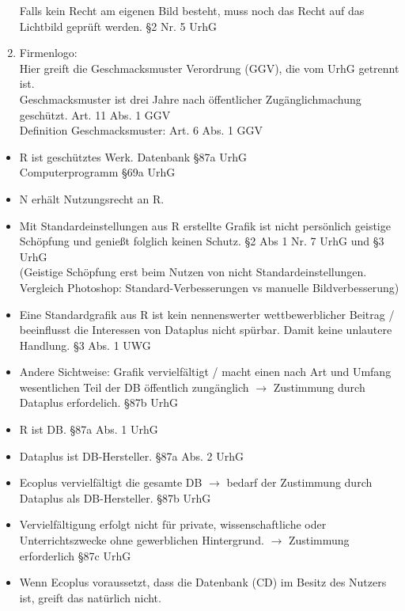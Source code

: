 \documentclass{scrreprt}
\begin{document}
\begin{anumerate}
\begin{enumerate}[label=\roman*.]
Falls kein Recht am eigenen Bild besteht, muss noch das Recht auf das Lichtbild geprüft werden. \hfill §2 Nr. 5 UrhG
\item Firmenlogo:\\
Hier greift die Geschmacksmuster Verordrung (GGV), die vom UrhG getrennt ist.\\
Geschmacksmuster ist drei Jahre nach öffentlicher Zugänglichmachung geschützt. \hfill Art. 11 Abs. 1 GGV\\
Definition Geschmacksmuster: Art. 6 Abs. 1 GGV
\end{enumerate}
\item \begin{itemize}
\item R ist geschütztes Werk. \hfill Datenbank §87a UrhG\\
\phantom{R}\hfill Computerprogramm §69a UrhG
\item N erhält Nutzungsrecht an R.
\item Mit Standardeinstellungen aus R erstellte Grafik ist nicht persönlich geistige Schöpfung und genießt folglich keinen Schutz. \hfill §2 Abs 1 Nr. 7 UrhG und §3 UrhG\\
(Geistige Schöpfung erst beim Nutzen von nicht Standardeinstellungen. Vergleich Photoshop: Standard-Verbesserungen vs manuelle Bildverbesserung)
\item Eine Standardgrafik aus R ist kein nennenswerter wettbewerblicher Beitrag / beeinflusst die Interessen von Dataplus nicht spürbar. Damit keine unlautere Handlung. \hfill  §3 Abs. 1 UWG
\item Andere Sichtweise: Grafik vervielfältigt / macht einen nach Art und Umfang wesentlichen Teil der DB öffentlich zungänglich $\to$ Zustimmung durch Dataplus erfordelich. \hfill §87b UrhG
\end{itemize}
\item \begin{itemize}
\item R ist DB. \hfill §87a Abs. 1 UrhG
\item Dataplus ist DB-Hersteller. \hfill §87a Abs. 2 UrhG
\item Ecoplus vervielfältigt die gesamte DB $\to$ bedarf der Zustimmung durch Dataplus als DB-Hersteller. \hfill §87b UrhG
\item Vervielfältigung erfolgt nicht für private, wissenschaftliche oder Unterrichtszwecke ohne gewerblichen Hintergrund. $\to$ Zustimmung erforderlich \hfill §87c UrhG
\item Wenn Ecoplus voraussetzt, dass die Datenbank (CD) im Besitz des Nutzers ist, greift das natürlich nicht.

\end{itemize}
\end{anumerate}
\end{document}
